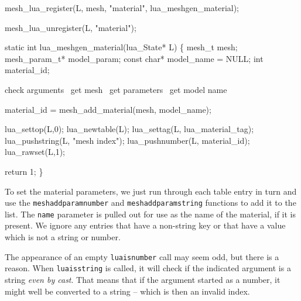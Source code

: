 \nwenddocs{}\plusendmoddef
mesh_lua_register(L, mesh, "material", lua_meshgen_material);
\nwendcode{}\nwdocspar

\nwenddocs{}\plusendmoddef
mesh_lua_unregister(L, "material");
\nwendcode{}\nwdocspar

\nwenddocs{}\plusendmoddef
static int lua_meshgen_material(lua_State* L)
\{
    mesh_t mesh;
    mesh_param_t* model_param;
    const char* model_name = NULL;
    int material_id;

    \LA{}check arguments~{\nwtagstyle{}}\RA{}
    \LA{}get \code{}mesh\edoc{}~{\nwtagstyle{}}\RA{}
    \LA{}get parameters~{\nwtagstyle{}}\RA{}
    \LA{}get model name~{\nwtagstyle{}}\RA{}

    material_id = mesh_add_material(mesh, model_name);

    lua_settop(L,0);
    lua_newtable(L);
    lua_settag(L, lua_material_tag);
    lua_pushstring(L, "mesh index");
    lua_pushnumber(L, material_id);
    lua_rawset(L,1);

    return 1;
\}

\nwendcode{}\nwdocspar

To set the material parameters, we just run through each table entry
in turn and use the {\tt{}mesh{}add{}param{}number} and {\tt{}mesh{}add{}param{}string}
functions to add it to the list.  The {\tt{}name} parameter is pulled out
for use as the name of the material, if it is present.  We ignore
any entries that have a non-string key or that have a value which is not 
a string or number.

The appearance of an empty {\tt{}lua{}isnumber} call may seem odd,
but there is a reason.  When {\tt{}lua{}isstring} is called, it will
check if the indicated argument is a string \emph{even by cast}.
That means that if the argument started as a number, it might well
be converted to a string -- which is then an invalid index.

